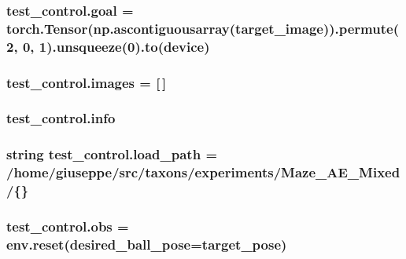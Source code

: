 \subsubsection[{\texorpdfstring{goal}{goal}}]{\setlength{\rightskip}{0pt plus 5cm}test\+\_\+control.\+goal = torch.\+Tensor(np.\+ascontiguousarray({\bf target\+\_\+image})).permute(2, 0, 1).unsqueeze(0).to({\bf device})}\hypertarget{namespacetest__control_a6407063ff49b106a8d24f1b31c76642f}{}\label{namespacetest__control_a6407063ff49b106a8d24f1b31c76642f}
\subsubsection[{\texorpdfstring{images}{images}}]{\setlength{\rightskip}{0pt plus 5cm}test\+\_\+control.\+images = \mbox{[}$\,$\mbox{]}}\hypertarget{namespacetest__control_a459ed214c974c2c8877f3c4e4bf4e49d}{}\label{namespacetest__control_a459ed214c974c2c8877f3c4e4bf4e49d}
\subsubsection[{\texorpdfstring{info}{info}}]{\setlength{\rightskip}{0pt plus 5cm}test\+\_\+control.\+info}\hypertarget{namespacetest__control_ad1d33270a3ae0b4f0502c46c11f29385}{}\label{namespacetest__control_ad1d33270a3ae0b4f0502c46c11f29385}
\subsubsection[{\texorpdfstring{load\+\_\+path}{load_path}}]{\setlength{\rightskip}{0pt plus 5cm}string test\+\_\+control.\+load\+\_\+path = \textquotesingle{}/home/giuseppe/src/taxons/experiments/Maze\+\_\+\+A\+E\+\_\+\+Mixed/\{\}\textquotesingle{}}\hypertarget{namespacetest__control_ae0ffacf2431cf5da41b09805a26a445f}{}\label{namespacetest__control_ae0ffacf2431cf5da41b09805a26a445f}
\subsubsection[{\texorpdfstring{obs}{obs}}]{\setlength{\rightskip}{0pt plus 5cm}test\+\_\+control.\+obs = env.\+reset(desired\+\_\+ball\+\_\+pose={\bf target\+\_\+pose})}\hypertarget{namespacetest__control_a97883b305a39e99ddbe21071b7351b46}{}\label{namespacetest__control_a97883b305a39e99ddbe21071b7351b46}
